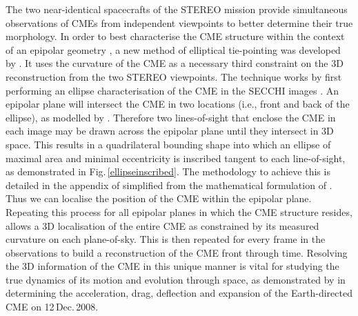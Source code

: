 \documentclass[preprint2]{aastex}
\begin{document}
The two near-identical spacecrafts of the STEREO mission provide simultaneous observations of CMEs from independent viewpoints to better determine their true morphology. In order to best characterise the CME structure within the context of an epipolar geometry \citep{2006astro.ph.12649I}, a new method of elliptical tie-pointing was developed by \citet{2010NatCo...1E..74B}. It uses the curvature of the CME as a necessary third constraint on the 3D reconstruction from the two STEREO viewpoints. The technique works by first performing an ellipse characterisation of the CME in the SECCHI images \citep{2009A&A...495..325B}. An epipolar plane will intersect the CME in two locations (i.e., front and back of the ellipse), as modelled by \citet{2004GeoRL..3121802P}. Therefore two lines-of-sight that enclose the CME in each image may be drawn across the epipolar plane until they intersect in 3D space. This results in a quadrilateral bounding shape into which an ellipse of maximal area and minimal eccentricity is inscribed tangent to each line-of-sight, as demonstrated in Fig.\,\ref{ellipseinscribed}. The methodology to achieve this is detailed in the appendix of \citet{2010NatCo...1E..74B} simplified from the mathematical formulation of \citet{2005AJMAA..2.1H}. Thus we can localise the position of the CME within the epipolar plane. Repeating this process for all epipolar planes in which the CME structure resides, allows a 3D localisation of the entire CME as constrained by its measured curvature on each plane-of-sky. This is then repeated for every frame in the observations to build a reconstruction of the CME front through time. Resolving the 3D information of the CME in this unique manner is vital for studying the true dynamics of its motion and evolution through space, as demonstrated by \citet{2010NatCo...1E..74B} in determining the acceleration, drag, deflection and expansion of the Earth-directed CME on 12\,Dec.\,2008.
\end{document}
